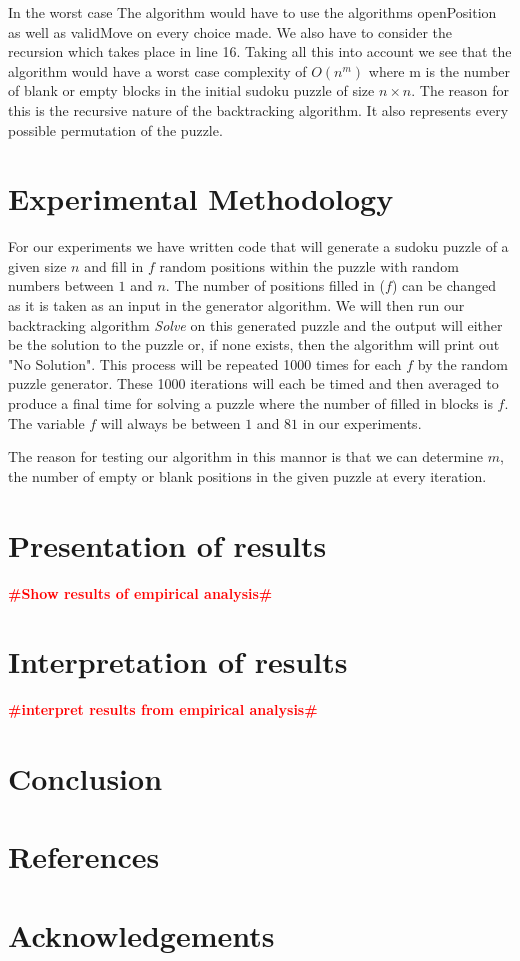 \documentclass[12pt,a4paper,titlepage]{article}
\newcommand{\todo}[1]{\textcolor{red}{\textbf{\##1\#}}}
\begin{document}
In the worst case The algorithm would have to use the algorithms openPosition as well as validMove on every choice made. We also have to consider the recursion which takes place in line 16. Taking all this into account we see that the algorithm would have a worst case complexity of $O(n^{m})$ where m is the number of blank or empty blocks in the initial sudoku puzzle of size $n \times n$. The reason for this is the recursive nature of the backtracking algorithm. It also represents every possible permutation of the puzzle.


\section{Experimental Methodology}

For our experiments we have written code that will generate a sudoku puzzle of a given size $n$ and fill in $f$ random positions within the puzzle with random numbers between $1$ and $n$. The number of positions filled in ($f$) can be changed as it is taken as an input in the generator algorithm. We will then run our backtracking algorithm \emph{Solve} on this generated puzzle and the output will either be the solution to the puzzle or, if none exists, then the algorithm will print out "No Solution". This process will be repeated 1000 times for each $f$ by the random puzzle generator. These 1000 iterations will each be timed and then averaged to produce a final time for solving a puzzle where the number of filled in blocks is $f$. The variable $f$ will always be between $1$ and $81$ in our experiments.

The reason for testing our algorithm in this mannor is that we can determine $m$, the number of empty or blank positions in the given puzzle at every iteration.  

\section{Presentation of results}

\todo{Show results of empirical analysis}

\section{Interpretation of results}

\todo{interpret results from empirical analysis}

\section{Conclusion}

\section{References}

\section{Acknowledgements}
\end{document}
